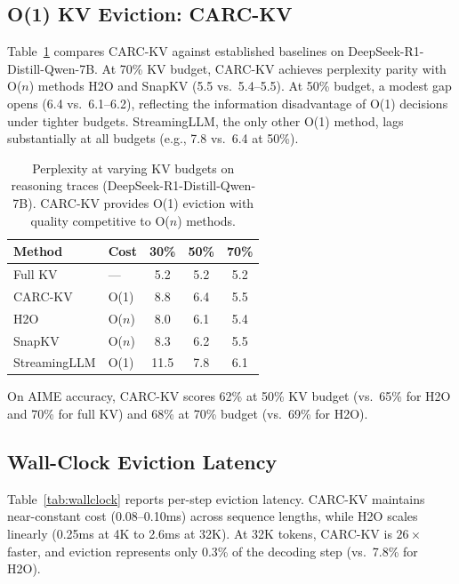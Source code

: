 \documentclass[11pt,a4paper]{article}
\begin{document}
\subsection{O(1) KV Eviction: CARC-KV}

Table~\ref{tab:kv_eviction} compares CARC-KV against established baselines on DeepSeek-R1-Distill-Qwen-7B.
At 70\% KV budget, CARC-KV achieves perplexity parity with O($n$) methods H2O and SnapKV (5.5 vs.\ 5.4--5.5).
At 50\% budget, a modest gap opens (6.4 vs.\ 6.1--6.2), reflecting the information disadvantage of O(1) decisions under tighter budgets.
StreamingLLM, the only other O(1) method, lags substantially at all budgets (e.g., 7.8 vs.\ 6.4 at 50\%).

\begin{table}[t]
\centering
\small
\begin{tabular}{llccc}
\toprule
\textbf{Method} & \textbf{Cost} & \textbf{30\%} & \textbf{50\%} & \textbf{70\%} \\
\midrule
Full KV       & ---    & 5.2  & 5.2  & 5.2  \\
CARC-KV       & O(1)   & 8.8  & 6.4  & 5.5  \\
H2O           & O($n$) & 8.0  & 6.1  & 5.4  \\
SnapKV        & O($n$) & 8.3  & 6.2  & 5.5  \\
StreamingLLM  & O(1)   & 11.5 & 7.8  & 6.1  \\
\bottomrule
\end{tabular}
\caption{Perplexity at varying KV budgets on reasoning traces (DeepSeek-R1-Distill-Qwen-7B). CARC-KV provides O(1) eviction with quality competitive to O($n$) methods.}
\label{tab:kv_eviction}
\end{table}

On AIME accuracy, CARC-KV scores 62\% at 50\% KV budget (vs.\ 65\% for H2O and 70\% for full KV) and 68\% at 70\% budget (vs.\ 69\% for H2O).

\subsection{Wall-Clock Eviction Latency}

Table~\ref{tab:wallclock} reports per-step eviction latency.
CARC-KV maintains near-constant cost (0.08--0.10ms) across sequence lengths, while H2O scales linearly (0.25ms at 4K to 2.6ms at 32K).
At 32K tokens, CARC-KV is $26\times$ faster, and eviction represents only 0.3\% of the decoding step (vs.\ 7.8\% for H2O).
\end{document}
